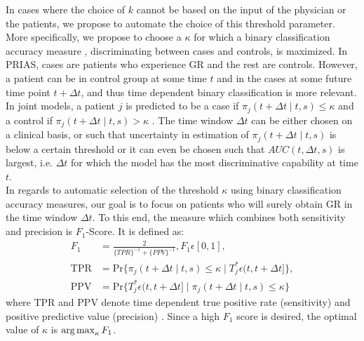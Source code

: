 In cases where the choice of $k$ cannot be based on the input of the physician or the patients, we propose to automate the choice of this threshold parameter. More specifically, we propose to choose a $\kappa$ for which a binary classification accuracy measure \citep{lopez2014optimalcutpoints,sokolova2009systematic}, discriminating between cases and controls, is maximized. In PRIAS, cases are patients who experience GR and the rest are controls. However, a patient can be in control group at some time $t$ and in the cases at some future time point $t + \Delta t$, and thus time dependent binary classification is more relevant. In joint models, a patient $j$ is predicted to be a case if $\pi_j(t + \Delta t \mid t,s) \leq \kappa$ and a control if $\pi_j(t + \Delta t \mid t,s) > \kappa$ \citep{rizopoulosJMbayes}. The time window $\Delta t$ can be either chosen on a clinical basis, or such that uncertainty in estimation of $\pi_j(t + \Delta t \mid t,s)$ is below a certain threshold or it can even be chosen such that $AUC(t, \Delta t, s)$ \citep{rizopoulosJMbayes} is largest, i.e. $\Delta t$ for which the model has the most discriminative capability at time $t$.\\

In regards to automatic selection of the threshold $\kappa$ using binary classification accuracy measures, our goal is to focus on patients who will surely obtain GR in the time window $\Delta t$. To this end, the measure which combines both sensitivity and precision is $F_1$-Score. It is defined as:
\begin{align*}
F_1 &= \frac{2}{\{TPR\}^{-1} + \{PPV\}^{-1}}, F_1 \epsilon [0,1],\\
\text{TPR} &= \mbox{Pr}\big\{\pi_j(t + \Delta t \mid t,s) \leq \kappa \mid T^*_j \epsilon (t, t + \Delta t]\big\},\\
\text{PPV} &= \mbox{Pr}\big\{T^*_j \epsilon (t, t + \Delta t] \mid \pi_j(t + \Delta t \mid t,s) \leq \kappa \big\}
\end{align*}
where TPR and PPV denote time dependent true positive rate (sensitivity) and positive predictive value (precision) \citep{rizopoulosJMbayes}. Since a high $F_1$ score is desired, the optimal value of $\kappa$ is $\operatorname{arg\,max}_{\kappa} F_1$.


